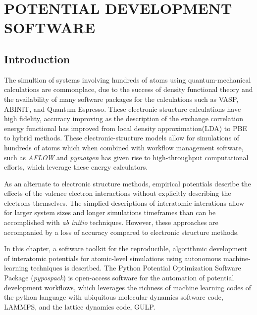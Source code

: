 \chapter{POTENTIAL DEVELOPMENT SOFTWARE}
\label{ch:software}
\lstset{
	language=python,
	numbers=left,
	numberstyle=\tiny,
	columns=fullflexible,
	showstringspaces=false
}
\section{Introduction}

The simultion of systems involving hundreds of atoms using quantum-mechanical calculations are commonplace, due to the success of density functional theory\cite{hohenberg1964_dft,kohn1965_dft} and the availability of many software packages for the calculations such as VASP\cite{kresse1993_vasp,kresse1996_vasp1,kresse1996_vasp2}, ABINIT\cite{gonze2002_abinit,gonze2005_abinit,gonze2009_abinit,gonze2016_abinit}, and Quantum Espresso\cite{giannozzi2009_quantumespresso}.
These electronic-structure calculations have high fidelity, accuracy improving as the description of the exchange correlation energy functional has improved from local density approximation(LDA) to PBE to hybrid methods.
These electronic-structure models allow for simulations of hundreds of atoms which when combined with workflow management software, such as \emph{AFLOW}\cite{curtarolo2012_aflow} and \emph{pymatgen}\cite{ong2013_pymatgen} has given rise to high-throughput computational efforts, which leverage these energy calculators.

As an alternate to electronic structure methods, empirical potentials describe the effects of the valence electron interactions without explicitly describing the electrons themselves.  The simplied descriptions of interatomic interations allow for larger system sizes and longer simulations timeframes than can be accomplished with \emph{ab initio} techniques.  However, these approaches are accompanied by a loss of accuracy compared to electronic structure methods.

In this chapter, a software toolkit for the reproducible, algorithmic development of interatomic potentials for atomic-level simulations using autonomous machine-learning techniques is described.
The Python Potential Optimization Software Package (\emph{pypospack}) is open-access software for the automation of potential development workflows, which leverages the richness of machine learning codes of the python language with ubiquitous molecular dynamics software code, LAMMPS\cite{plimpton1995_lammps}, and the lattice dynamics code, GULP\cite{gale2003_gulp}.

